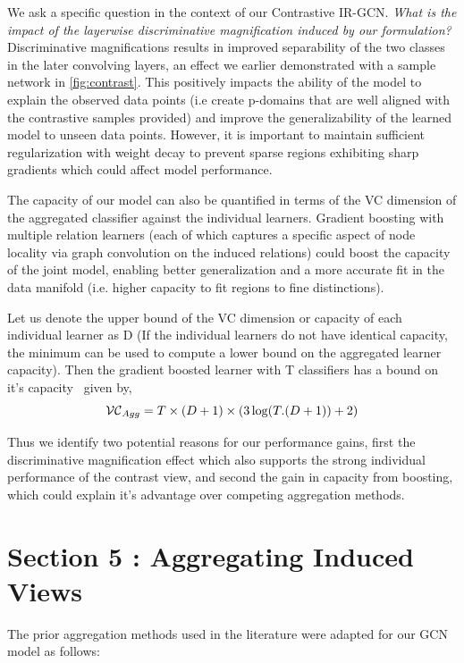 \documentclass[smallcondensed]{svjour3}     %
\begin{document}
We ask a specific question in the context of our Contrastive IR-GCN. \emph{What is the impact of the layerwise discriminative magnification induced by our formulation?} Discriminative magnifications results in improved separability of the two classes in the later convolving layers, an effect we earlier demonstrated with a sample network in \cref{fig:contrast}. This positively impacts the ability of the model to explain the observed data points (i.e create p-domains that are well aligned with the contrastive samples provided) and improve the generalizability of the learned model to unseen data points. However, it is important to maintain sufficient regularization with weight decay to prevent sparse regions exhibiting sharp gradients which could affect model performance.

The capacity of our model can also be quantified in terms of the VC dimension of the aggregated classifier against the individual learners. Gradient boosting with multiple relation learners (each of which captures a specific aspect of node locality via graph convolution on the induced relations) could boost the capacity of the joint model, enabling better generalization and a more accurate fit in the data manifold (i.e. higher capacity to fit regions to fine distinctions).

Let us denote the upper bound of the VC dimension or capacity of each individual learner as D (If the individual learners do not have identical capacity, the minimum can be used to compute a lower bound on the aggregated learner capacity). Then the gradient boosted learner with T classifiers has a bound on it's capacity~\cite{shalev2014understanding} given by,
\begin{equation*}
\mathcal{VC}_{Agg}  = T \times (D+1) \times(3 \log(T.(D+1))+2)
\label{vcdim}
\vspace{-0.03in}
\end{equation*}

Thus we identify two potential reasons for our performance gains, first the discriminative magnification effect which also supports the strong individual performance of the contrast view, and second the gain in capacity from boosting, which could explain it's advantage over competing aggregation methods.

\section{Section 5 : Aggregating Induced Views}
The prior aggregation methods used in the literature were adapted for our GCN model as follows:
\end{document}
